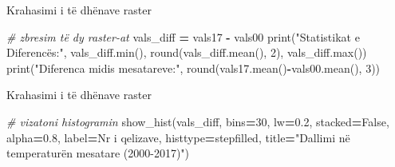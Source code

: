 \documentclass[
  ignorenonframetext,
]{beamer}
\newenvironment{Shaded}{\begin{snugshade}}{\end{snugshade}}
\newcommand{\BuiltInTok}[1]{#1}
\newcommand{\CommentTok}[1]{\textcolor[rgb]{0.56,0.35,0.01}{\textit{#1}}}
\newcommand{\DecValTok}[1]{\textcolor[rgb]{0.00,0.00,0.81}{#1}}
\newcommand{\FloatTok}[1]{\textcolor[rgb]{0.00,0.00,0.81}{#1}}
\newcommand{\NormalTok}[1]{#1}
\newcommand{\OperatorTok}[1]{\textcolor[rgb]{0.81,0.36,0.00}{\textbf{#1}}}
\newcommand{\StringTok}[1]{\textcolor[rgb]{0.31,0.60,0.02}{#1}}
\newcommand{\VariableTok}[1]{\textcolor[rgb]{0.00,0.00,0.00}{#1}}
\begin{document}
\begin{frame}[fragile]{Krahasimi i të dhënave raster}
\protect\hypertarget{krahasimi-i-tuxeb-dhuxebnave-raster-5}{}

\begin{Shaded}
\begin{Highlighting}[]
\CommentTok{\# zbresim të dy raster{-}at}
\NormalTok{vals\_diff }\OperatorTok{=}\NormalTok{ vals17 }\OperatorTok{{-}}\NormalTok{ vals00}
\BuiltInTok{print}\NormalTok{(}\StringTok{"Statistikat e Diferencës:"}\NormalTok{, vals\_diff.}\BuiltInTok{min}\NormalTok{(), }\BuiltInTok{round}\NormalTok{(vals\_diff.mean(), }\DecValTok{2}\NormalTok{), vals\_diff.}\BuiltInTok{max}\NormalTok{())}
\BuiltInTok{print}\NormalTok{(}\StringTok{"Diferenca midis mesatareve:"}\NormalTok{, }\BuiltInTok{round}\NormalTok{(vals17.mean()}\OperatorTok{{-}}\NormalTok{vals00.mean(), }\DecValTok{3}\NormalTok{))}
\end{Highlighting}
\end{Shaded}
\end{frame}

\begin{frame}[fragile]{Krahasimi i të dhënave raster}
\protect\hypertarget{krahasimi-i-tuxeb-dhuxebnave-raster-6}{}

\begin{Shaded}
\begin{Highlighting}[]
\CommentTok{\# vizatoni histogramin}
\NormalTok{show\_hist(vals\_diff, bins}\OperatorTok{=}\DecValTok{30}\NormalTok{, lw}\OperatorTok{=}\FloatTok{0.2}\NormalTok{, stacked}\OperatorTok{=}\VariableTok{False}\NormalTok{, alpha}\OperatorTok{=}\FloatTok{0.8}\NormalTok{, label}\OperatorTok{=}\StringTok{\textquotesingle{}Nr i qelizave\textquotesingle{}}\NormalTok{,}
\NormalTok{    histtype}\OperatorTok{=}\StringTok{\textquotesingle{}stepfilled\textquotesingle{}}\NormalTok{, title}\OperatorTok{=}\StringTok{"Dallimi në temperaturën mesatare (2000{-}2017)"}\NormalTok{)}
\end{Highlighting}
\end{Shaded}
\end{frame}
\end{document}
